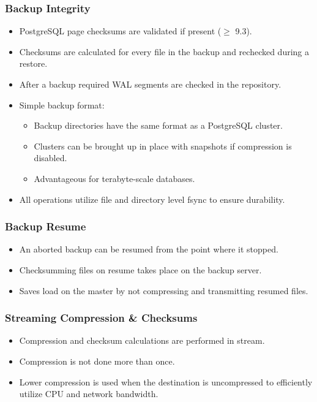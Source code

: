 \begin{frame}
    \frametitle{Backup Integrity}

    \begin{itemize}
        \item PostgreSQL page checksums are validated if present ($\geqslant$ 9.3).\pause
        \item Checksums are calculated for every file in the backup and rechecked during a restore.\pause
        \item After a backup required WAL segments are checked in the repository.\pause
        \item Simple backup format:\pause

            \begin{itemize}
                \item Backup directories have the same format as a PostgreSQL cluster.\pause
                \item Clusters can be brought up in place with snapshots if compression is disabled.\pause
                \item Advantageous for terabyte-scale databases.\pause
            \end{itemize}

        \item All operations utilize file and directory level fsync to ensure durability.
    \end{itemize}
\end{frame}

\begin{frame}
    \frametitle{Backup Resume}

    \begin{itemize}
        \item An aborted backup can be resumed from the point where it stopped.\pause
        \item Checksumming files on resume takes place on the backup server.\pause
        \item Saves load on the master by not compressing and transmitting resumed files.
    \end{itemize}
\end{frame}

\begin{frame}
    \frametitle{Streaming Compression \& Checksums}

    \begin{itemize}
        \item Compression and checksum calculations are performed in stream.\pause
        \item Compression is not done more than once.\pause
        \item Lower compression is used when the destination is uncompressed to efficiently utilize CPU and network bandwidth.
    \end{itemize}
\end{frame}

